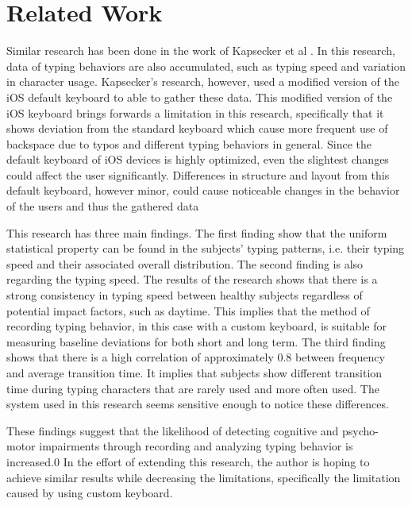 \chapter{Related Work}


Similar research has been done in the work of Kapsecker et al \cite{kapsecker2022}. 
In this research, data of typing behaviors are also accumulated, such as typing speed and variation in character usage. 
Kapsecker's research, however, used a modified version of the iOS default keyboard to able to gather these data. 
This modified version of the iOS keyboard brings forwards a limitation in this research, specifically that it shows deviation from the standard keyboard which cause more frequent use of backspace due to typos and different typing behaviors in general.
Since the default keyboard of iOS devices is highly optimized, even the slightest changes could affect the user significantly. 
Differences in structure and layout from this default keyboard, however minor, could cause noticeable changes in the behavior of the users and thus the gathered data

This research has three main findings. 
The first finding show that the uniform statistical property can be found in the subjects' typing patterns, i.e. their typing speed and their associated overall distribution. 
The second finding is also regarding the typing speed. 
The results of the research shows that there is a strong consistency in typing speed between healthy subjects regardless of potential impact factors, such as daytime. 
This implies that the method of recording typing behavior, in this case with a custom keyboard, is suitable for measuring baseline deviations for both short and long term. 
The third finding shows that there is a high correlation of approximately 0.8 between frequency and average transition time. 
It implies that subjects show different transition time during typing characters that are rarely used and more often used. 
The system used in this research seems sensitive enough to notice these differences.

These findings suggest that the likelihood of detecting cognitive and psycho-motor impairments through recording and analyzing typing behavior is increased.0
In the effort of extending this research, the author is hoping to achieve similar results while decreasing the limitations, specifically the limitation caused by using custom keyboard.

